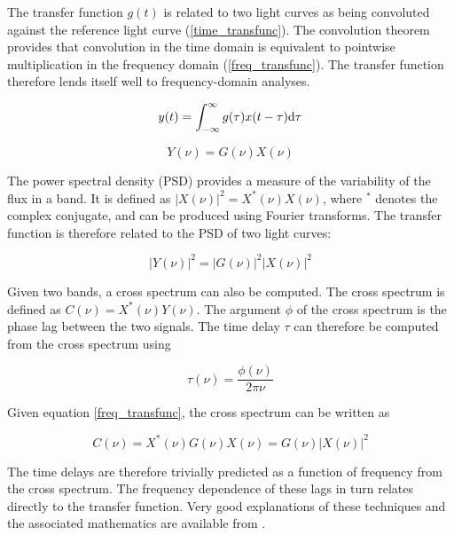 \documentclass[11pt,letterpaper]{article}
\begin{document}
	The transfer function $g(t)$ is related to two light curves as being convoluted against the reference light curve (\ref{time_transfunc}). The convolution theorem provides that convolution in the time domain is equivalent to pointwise multiplication in the frequency domain (\ref{freq_transfunc}). The transfer function therefore lends itself well to frequency-domain analyses.

	\begin{equation}
		\label{time_transfunc}
		y(t) = \int_{-\infty}^{\infty} g(\tau) x(t-\tau)  {\rm d}\tau
	\end{equation}

	\begin{equation}
		\label{freq_transfunc}
		Y(\nu) = G(\nu) X(\nu)
	\end{equation}

    The power spectral density (PSD) provides a measure of the variability of the flux in a band. It is defined as $|X(\nu)|^2 = X^*(\nu)X(\nu)$, where $^*$ denotes the complex conjugate, and can be produced using Fourier transforms. The transfer function is therefore related to the PSD of two light curves:

    \begin{equation}
        |Y(\nu)|^2 = |G(\nu)|^2 |X(\nu)|^2
    \end{equation}

    Given two bands, a cross spectrum can also be computed. The cross spectrum is defined as $C(\nu) = X^*(\nu) Y(\nu)$. The argument $\phi$ of the cross spectrum is the phase lag between the two signals. The time delay $\tau$ can therefore be computed from the cross spectrum using

    \begin{equation}
        \tau(\nu) = \frac{\phi(\nu)}{2\pi\nu}
    \end{equation}

    Given equation \ref{freq_transfunc}, the cross spectrum can be written as

    \begin{equation}
        C(\nu) = X^*(\nu) G(\nu) X(\nu) =  G(\nu) |X(\nu)|^2
    \end{equation}

    The time delays are therefore trivially predicted as a function of frequency from the cross spectrum. The frequency dependence of these lags in turn relates directly to the transfer function. Very good explanations of these techniques and the associated mathematics are available from \cite{2014A&ARv..22...72U}.
\end{document}
